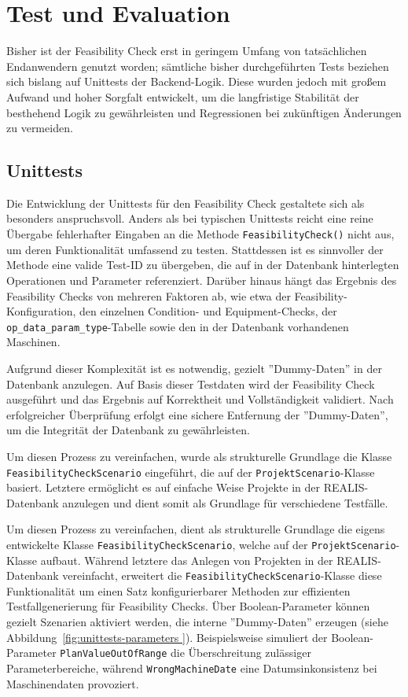 \chapter{Test und Evaluation}

Bisher ist der Feasibility Check erst in geringem Umfang von tatsächlichen Endanwendern genutzt worden; sämtliche bisher durchgeführten Tests beziehen sich bislang auf Unittests der Backend-Logik. Diese wurden jedoch mit großem Aufwand und hoher Sorgfalt entwickelt, um die langfristige Stabilität der besthehend Logik zu gewährleisten und Regressionen bei zukünftigen Änderungen zu vermeiden.

\section{Unittests}

Die Entwicklung der Unittests für den Feasibility Check gestaltete sich als besonders anspruchsvoll. Anders als bei typischen Unittests reicht eine reine Übergabe fehlerhafter Eingaben an die Methode \texttt{FeasibilityCheck()} nicht aus, um deren Funktionalität umfassend zu testen. Stattdessen ist es sinnvoller der Methode eine valide Test-ID zu übergeben, die auf in der Datenbank hinterlegten Operationen und Parameter referenziert. Darüber hinaus hängt das Ergebnis des Feasibility Checks von mehreren Faktoren ab, wie etwa der Feasibility-Konfiguration, den einzelnen Condition- und Equipment-Checks, der \texttt{op\_data\_param\_type}-Tabelle sowie den in der Datenbank vorhandenen Maschinen.

Aufgrund dieser Komplexität ist es notwendig, gezielt ''Dummy-Daten'' in der Datenbank anzulegen. Auf Basis dieser Testdaten wird der Feasibility Check ausgeführt und das Ergebnis auf Korrektheit und Vollständigkeit validiert. Nach erfolgreicher Überprüfung erfolgt eine sichere Entfernung der ''Dummy-Daten'', um die Integrität der Datenbank zu gewährleisten.

Um diesen Prozess zu vereinfachen, wurde als strukturelle Grundlage die Klasse \texttt{FeasibilityCheckScenario} eingeführt, die auf der \texttt{ProjektScenario}-Klasse basiert. Letztere ermöglicht es auf einfache Weise Projekte in der REALIS-Datenbank anzulegen und dient somit als Grundlage für verschiedene Testfälle.

Um diesen Prozess zu vereinfachen, dient als strukturelle Grundlage die eigens entwickelte Klasse \texttt{FeasibilityCheckScenario}, welche auf der \texttt{ProjektScenario}-Klasse aufbaut. Während letztere das Anlegen von Projekten in der REALIS-Datenbank vereinfacht, erweitert die \texttt{FeasibilityCheckScenario}-Klasse diese Funktionalität um einen Satz konfigurierbarer Methoden zur effizienten Testfallgenerierung für Feasibility Checks. Über Boolean-Parameter können gezielt Szenarien aktiviert werden, die interne ''Dummy-Daten'' erzeugen (siehe Abbildung~\ref{fig:unittests-parameters }). Beispielsweise simuliert der Boolean-Parameter \texttt{PlanValueOutOfRange} die Überschreitung zulässiger Parameterbereiche, während \texttt{WrongMachineDate} eine Datumsinkonsistenz bei Maschinendaten provoziert.

